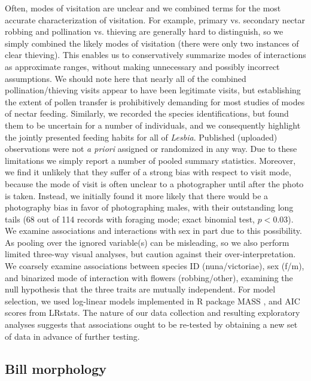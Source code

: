 \documentclass[fleqn,10pt,lineno]{wlpeerj}
\begin{document}
Often, modes of visitation are unclear and we combined terms for the most accurate characterization of visitation. 
For example, primary vs. secondary nectar robbing and pollination vs. thieving are generally hard to distinguish, so we simply combined the likely modes of visitation (there were only two instances of clear thieving). 
This enables us to conservatively summarize modes of interactions as approximate ranges, without making unnecessary and possibly incorrect assumptions.
We should note here that nearly all of the combined pollination/thieving visits appear to have been legitimate visits, but establishing the extent of pollen transfer is prohibitively demanding for most studies of modes of nectar feeding.
Similarly, we recorded the species identifications, but found them to be uncertain for a number of individuals, and we consequently highlight the jointly presented feeding habits for all of \textit{Lesbia}.
Published (uploaded) observations were not \textit{a priori} assigned or randomized in any way.
Due to these limitations we simply report a number of pooled summary statistics. 
Moreover, we find it unlikely that they suffer of a strong bias with respect to visit mode, because the mode of visit is often unclear to a photographer until after the photo is taken.
Instead, we initially found it more likely that there would be a photography bias in favor of photographing males, with their outstanding long tails (68 out of 114 records with foraging mode; exact binomial test, $p<0.03$).
We examine associations and interactions with sex in part due to this possibility.
As pooling over the ignored variable(s) can be misleading, so we also perform limited three-way visual analyses, but caution against their over-interpretation. 
We coarsely examine associations between  species ID (nuna/victoriae), sex (f/m), and binarized mode of interaction with flowers (robbing/other), examining the null hypothesis that the three traits are mutually independent.
For model selection, we used log-linear models implemented in R package MASS \citep{R}, and AIC scores from LRstats.
The nature of our data collection and resulting exploratory analyses suggests that associations ought to be re-tested by obtaining a new set of data in advance of further testing.

\subsection*{Bill morphology}
\end{document}
